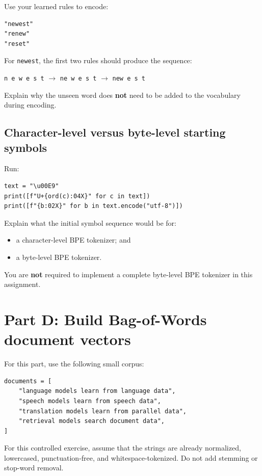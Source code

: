 \documentclass[11pt,a4paper]{article}
\begin{document}
Use your learned rules to encode:

\begin{lstlisting}
"newest"
"renew"
"reset"
\end{lstlisting}

For \texttt{newest}, the first two rules should produce the sequence:

\begin{center}
\texttt{n e w e s t} $\rightarrow$ \texttt{ne w e s t} $\rightarrow$ \texttt{new e s t}
\end{center}

Explain why the unseen word does \textbf{not} need to be added to the vocabulary during encoding.

\subsection{Character-level versus byte-level starting symbols}

Run:

\begin{lstlisting}
text = "\u00E9"
print([f"U+{ord(c):04X}" for c in text])
print([f"{b:02X}" for b in text.encode("utf-8")])
\end{lstlisting}

Explain what the initial symbol sequence would be for:

\begin{itemize}
  \item a character-level BPE tokenizer; and
  \item a byte-level BPE tokenizer.
\end{itemize}

You are \textbf{not} required to implement a complete byte-level BPE tokenizer in this assignment.

\section{Part D: Build Bag-of-Words document vectors}

For this part, use the following small corpus:

\begin{lstlisting}
documents = [
    "language models learn from language data",
    "speech models learn from speech data",
    "translation models learn from parallel data",
    "retrieval models search document data",
]
\end{lstlisting}

For this controlled exercise, assume that the strings are already normalized, lowercased, punctuation-free, and whitespace-tokenized. Do not add stemming or stop-word removal.
\end{document}
